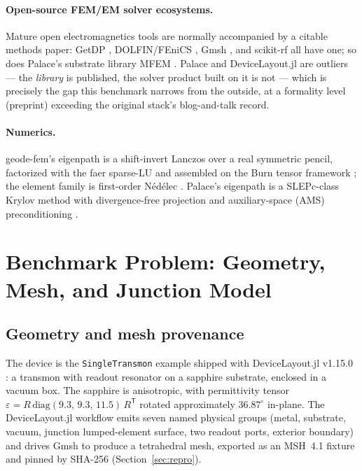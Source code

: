 \documentclass{anvil-paper}
\begin{document}
\paragraph{Open-source FEM/EM solver ecosystems.}
Mature open electromagnetics tools are normally accompanied by a citable
methods paper: GetDP \citep{dular1998general}, DOLFIN/FEniCS
\citep{logg2010dolfin}, Gmsh \citep{gmsh}, and scikit-rf
\citep{arsenovic2022scikit} all have one; so does Palace's substrate
library MFEM \citep{mfem,andrej2024high}. Palace and DeviceLayout.jl are
outliers --- the \emph{library} is published, the solver product built on
it is not --- which is precisely the gap this benchmark narrows from the
outside, at a formality level (preprint) exceeding the original stack's
blog-and-talk record.

\paragraph{Numerics.}
geode-fem's eigenpath is a shift-invert Lanczos \citep{arpack} over a real
symmetric pencil, factorized with the faer sparse-LU \citep{kazdadi2026faer}
and assembled on the Burn tensor framework \citep{burn}; the element family
is first-order N\'ed\'elec \citep{nedelec1980}. Palace's eigenpath is a
SLEPc-class Krylov method \citep{slepc} with divergence-free projection and
auxiliary-space (AMS) preconditioning
\citep{hiptmair-xu,tzaniovkolevpanayotsvassilevski2018parallel}.

\section{Benchmark Problem: Geometry, Mesh, and Junction Model}
\label{sec:problem}

\subsection{Geometry and mesh provenance}
\label{sec:geometry}

The device is the \texttt{SingleTransmon} example shipped with
DeviceLayout.jl v1.15.0 \citep{devicelayout}: a transmon with readout
resonator on a sapphire substrate, enclosed in a vacuum box. The sapphire is
anisotropic, with permittivity tensor
$\varepsilon = R\,\mathrm{diag}(9.3,\, 9.3,\, 11.5)\,R^{\mathsf{T}}$
rotated approximately $36.87^\circ$ in-plane. The DeviceLayout.jl workflow
emits seven named physical groups (metal, substrate, vacuum, junction
lumped-element surface, two readout ports, exterior boundary) and drives
Gmsh \citep{gmsh} to produce a tetrahedral mesh, exported as an MSH~4.1
fixture and pinned by SHA-256 (Section~\ref{sec:repro}).
\end{document}
